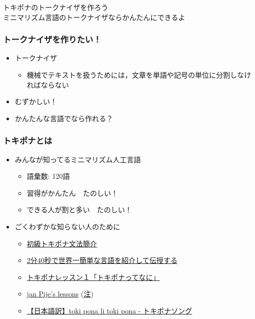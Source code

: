 \documentclass[14pt]{beamer}
\begin{document}
\begin{frame}
	\begin{center}
		{\LARGE \color{cyan} トキポナのトークナイザを作ろう} \\
		\vspace{1em}
		{\scriptsize ミニマリズム言語のトークナイザならかんたんにできるよ}
	\end{center}
\end{frame}


\begin{frame}
	\frametitle{トークナイザを作りたい！}
	
	\begin{itemize}
		\item トークナイザ
			\begin{itemize}
				\item 機械でテキストを扱うためには，文章を単語や記号の単位に分割しなければならない
			\end{itemize}
		\item むずかしい！
		\item \alert{かんたん}な言語でなら作れる？
	\end{itemize}
	
\end{frame}

\begin{frame}
	\frametitle{トキポナとは}

	\begin{itemize}
		\item みんなが知ってるミニマリズム人工言語
			\begin{itemize}
				\item 語彙数: \alert{120語}
				\item 習得がかんたん　たのしい！
				\item できる人が割と多い　たのしい！
			\end{itemize}
		\item ごくわずかな知らない人のために
			\begin{itemize}
				\item \href{https://twitter.com/notolytos/status/1409484535151042568}{\small 初級トキポナ文法簡介}
				\item \href{https://www.youtube.com/watch?v=9C0YqTs4vB8}{\small 2分40秒で世界一簡単な言語を紹介して伝授する}
				\item \href{https://www.youtube.com/watch?v=wIFJfAhiPlE}{\small トキポナレッスン１「トキポナってなに」}
				\item \href{https://en.wikibooks.org/wiki/Updated\_jan\_Pije\%27s\_lessons}{\small jan Pije's lessons} 
					{\scriptsize (\href{https://github.com/stefichjo/toki-pona/blob/master/pije.md}{注})}
				\item \href{https://www.youtube.com/watch?v=2jRtYBaZGgQ}{\small 【日本語訳】toki pona li toki pona - トキポナソング}
			\end{itemize}
	\end{itemize}
\end{frame}
\end{document}

